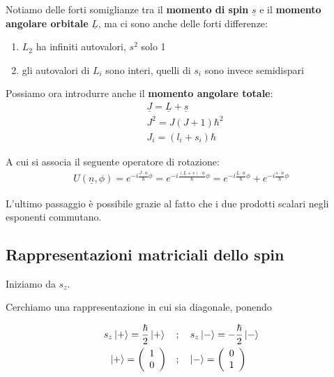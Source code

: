 Notiamo delle forti somiglianze tra il \textbf{momento di spin} $\underline{s}$ e il \textbf{momento angolare orbitale} $\underline{L}$, ma ci sono anche delle forti differenze:

\begin{enumerate}
	\item $L_2$ ha infiniti autovalori, $s^2$ solo 1 
	\item gli autovalori di $L_i$ sono interi, quelli di $s_i$ sono invece semidispari 
\end{enumerate}

Possiamo ora introdurre anche il \textbf{momento angolare totale}:
\begin{align}
{}&\underline{J}= \underline{L} + \underline{s} \\
&J^2 = J(J+1)\hbar^2 \\
&J_i = (l_i + s_i)\hbar
\end{align}

A cui si associa il seguente operatore di rotazione:
\begin{align}
U(\underline{n}, \phi) =  e^{-i \frac{\underline{J} \cdot \underline{n}}{\hbar}\phi} = e^{-i \frac{(\underline{L} + \underline{s}) \cdot \underline{n}}{\hbar}\phi} = e^{-i \frac{\underline{L} \cdot \underline{n}}{\hbar}\phi} + e^{-i \frac{\underline{s} \cdot \underline{n}}{\hbar}\phi}
\end{align}


L'ultimo passaggio è possibile grazie al fatto che i due prodotti scalari negli esponenti commutano.
		
\subsection{Rappresentazioni matriciali dello spin}

Iniziamo da  $s_z$.

Cerchiamo una rappresentazione in cui sia diagonale, ponendo

\begin{align}
s_z\ket{+} = \frac{\hbar}{2} \ket{+} \quad {}&; \quad s_z\ket{-} = -\frac{\hbar}{2} \ket{-} \\
\ket{+}= \left(
\begin{array}{cc}
1 \\
0
\end{array}
\right)  \quad &; \quad 
\ket{-}= \left(
\begin{array}{cc}
0 \\
1
\end{array}
\right)
\end{align}

